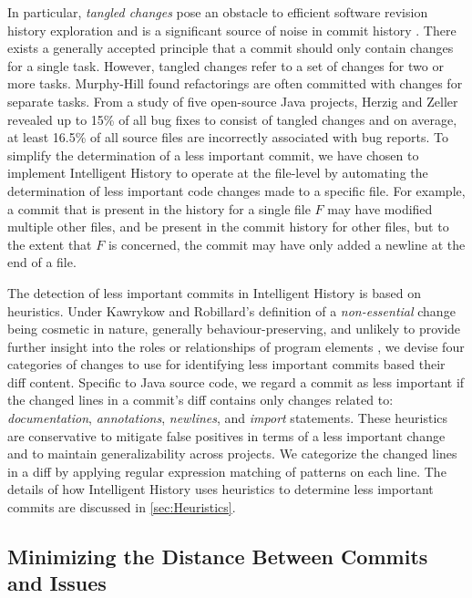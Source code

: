 In particular, \emph{tangled changes} pose an obstacle to efficient software revision history exploration and is a significant source of noise in commit history \cite{herzig_tangled_2013}.
There exists a generally accepted principle that a commit should only contain changes for a single task.
However, tangled changes refer to a set of changes for two or more tasks. 
Murphy-Hill \etal \cite{murphy-hill_refactor_2012} found refactorings are often committed with changes for separate tasks. 
From a study of five open-source Java projects, Herzig and Zeller \cite{herzig_tangled_2013} revealed up to 15\% of all bug fixes to consist of tangled changes and on average, at least 16.5\% of all source files are incorrectly associated with bug reports. 
To simplify the determination of a less important commit, we have chosen to implement Intelligent History to operate at the file-level by automating the determination of less important code changes made to a specific file. 
For example, a commit that is present in the history for a single file $F$ may have modified multiple other files, and be present in the commit history for other files, but to the extent that $F$ is concerned, the commit may have only added a newline at the end of a file.

The detection of less important commits in Intelligent History is based on heuristics.
Under Kawrykow and Robillard's definition of a \emph{non-essential} change being cosmetic in nature, generally behaviour-preserving, and unlikely to provide further insight into the roles or relationships of program elements \cite{kawrykow_non-essential_2011}, we devise four categories of changes to use for identifying less important commits based their diff content.
Specific to Java source code, we regard a commit as less important if the changed lines in a commit's diff contains only changes related to: \emph{documentation}, \emph{annotations}, \emph{newlines}, and \emph{import} statements.
These heuristics are conservative to mitigate false positives in terms of a less important change and to maintain generalizability across projects.
We categorize the changed lines in a diff by applying regular expression matching of patterns on each line.
The details of how Intelligent History uses heuristics to determine less important commits are discussed in \autoref{sec:Heuristics}.

\subsection{Minimizing the Distance Between Commits and Issues}
\label{subsec:Minimize-Commit-Issue-Distance}

